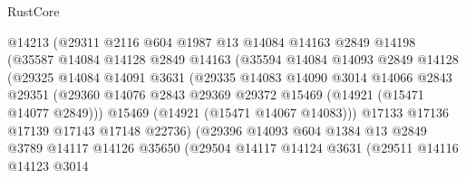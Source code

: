 \begin{lexlean}{RustCore}
\begin{coremodule}
                          @14213
                          (@29311
                            @2116
                            @604
                            @1987
                            @13
                            @14084
                            @14163
                            @2849
                            @14198
                            (@35587
                              @14084
                              @14128
                              @2849
                              @14163
                              (@35594
                                @14084
                                @14093
                                @2849
                                @14128
                                (@29325
                                  @14084
                                  @14091
                                  @3631
                                  (@29335
                                    @14083
                                    @14090
                                    @3014
                                    @14066
                                    @2843
                                    @29351
                                    (@29360
                                      @14076
                                      @2843
                                      @29369
                                      @29372
                                      @15469
                                      (@14921 (@15471 @14077 @2849)))
                                    @15469
                                    (@14921 (@15471 @14067 @14083)))
                                  @17133
                                  @17136
                                  @17139
                                  @17143
                                  @17148
                                  @22736)
                                (@29396
                                  @14093
                                  @604
                                  @1384
                                  @13
                                  @2849
                                  @3789
                                  @14117
                                  @14126
                                  @35650
                                  (@29504
                                    @14117
                                    @14124
                                    @3631
                                    (@29511
                                      @14116
                                      @14123
                                      @3014

\end{coremodule}
\end{lexlean}
